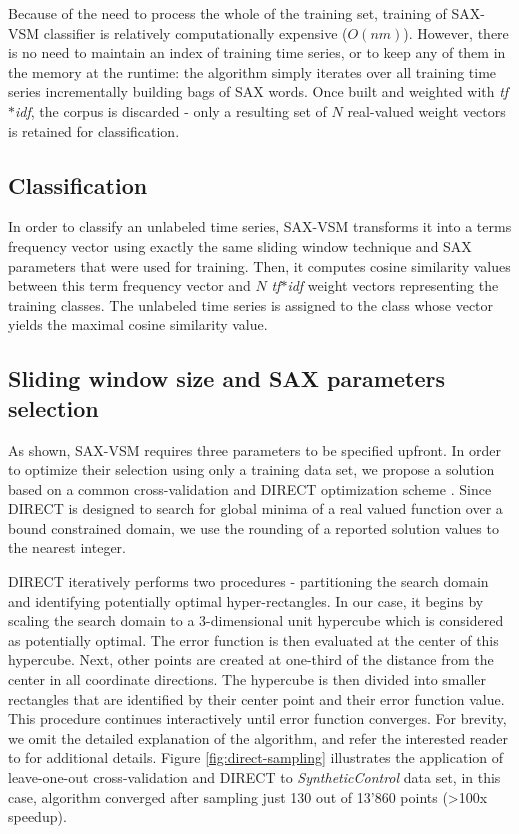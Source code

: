 \documentclass[conference]{IEEEtran}
\begin{document}
Because of the need to process the whole of the training set, 
training of SAX-VSM classifier is relatively computationally expensive ($O(nm)$). 
However, there is no need to maintain an index of training time series, 
or to keep any of them in the memory at the runtime: 
the algorithm simply iterates over all training time series incrementally building 
bags of SAX words. Once built and weighted with \textit{tf$\ast$idf}, 
the corpus is discarded - only a resulting set of $N$ real-valued weight vectors 
is retained for classification. 

\subsection{Classification}
In order to classify an unlabeled time series, SAX-VSM transforms it into a
terms frequency vector using exactly the same sliding window technique 
and SAX parameters that were used for training. 
Then, it computes cosine similarity values between this term frequency vector 
and $N$ \textit{tf$\ast$idf} weight vectors representing the training classes. 
The unlabeled time series is assigned to the class whose vector yields the
maximal cosine similarity value.

\subsection{Sliding window size and SAX parameters selection} \label{section-direct}
As shown, SAX-VSM requires three parameters to be specified upfront. 
In order to optimize their selection using only a training data set, we propose a solution based 
on a common cross-validation and DIRECT optimization scheme \cite{direct-original}.
Since DIRECT is designed to search for global minima of a real valued function 
over a bound constrained domain, we use the rounding of a reported solution values 
to the nearest integer.

DIRECT iteratively performs two procedures - partitioning the search domain and identifying 
potentially optimal hyper-rectangles.
In our case, it begins by scaling the search domain to a 3-dimensional unit hypercube 
which is considered as potentially optimal. 
The error function is then evaluated at the center of this hypercube. Next, other points are 
created at one-third of the distance from the center in all coordinate directions. 
The hypercube is then divided into smaller rectangles that are identified by their center point 
and their error function value. This procedure continues interactively until error function
converges.
For brevity, we omit the detailed explanation of the algorithm, and refer the 
interested reader to \cite{direct} for additional details. Figure \ref{fig:direct-sampling} 
illustrates the application of leave-one-out cross-validation and DIRECT to 
\textit{SyntheticControl} data set, in this case, algorithm converged after sampling 
just 130 out of 13'860 points (\textgreater100x speedup).
\end{document}
